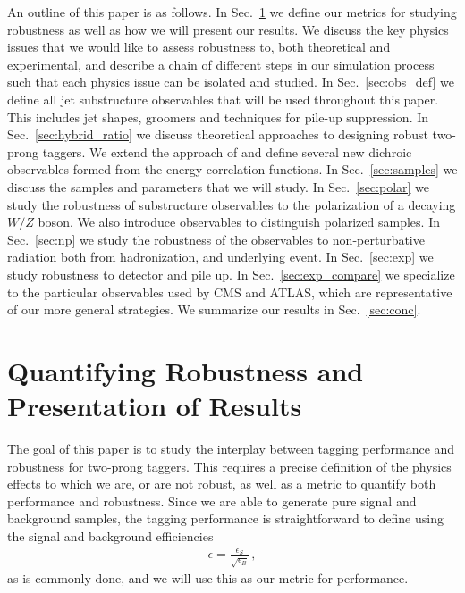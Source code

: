 \documentclass[11pt,letterpaper]{article}
\DeclareRobustCommand{\Sec}[1]{Sec.~\ref{#1}}
\begin{document}
An outline of this paper is as follows. In \Sec{sec:pres} we define our metrics for studying robustness as well as how we will present our results. We discuss the key physics issues that we would like to assess robustness to, both theoretical and experimental, and describe a chain of different steps in our simulation process such that each physics issue can be isolated and studied. In \Sec{sec:obs_def} we define all jet substructure observables that will be used throughout this paper. This includes jet shapes, groomers and techniques for pile-up suppression. In \Sec{sec:hybrid_ratio} we discuss theoretical approaches to designing robust two-prong taggers. We extend the approach of \cite{Salam:2016yht} and define several new dichroic observables formed from the energy correlation functions.  In \Sec{sec:samples} we discuss the samples and parameters that we will study. In \Sec{sec:polar} we study the robustness of substructure observables to the polarization of a decaying $W/Z$ boson. We also introduce observables to distinguish polarized samples. In \Sec{sec:np} we study the robustness of the observables to non-perturbative radiation both from hadronization, and underlying event. In \Sec{sec:exp} we study robustness to detector and pile up. In \Sec{sec:exp_compare} we specialize to the particular observables used by CMS and ATLAS, which are representative of our more general strategies. We summarize our results in \Sec{sec:conc}.

\section{Quantifying Robustness and Presentation of Results}\label{sec:pres}


The goal of this paper is to study the interplay between tagging performance and robustness for two-prong taggers. This requires a precise definition of the physics effects to which we are, or are not robust, as well as a metric to quantify both performance and robustness. Since we are able to generate pure signal and background samples, the tagging performance is straightforward to define using the signal and background efficiencies 
\begin{align}
\epsilon=\frac{\epsilon_S}{\sqrt{\epsilon_B}}\,,
\end{align}
as is commonly done, and we will use this as our metric for performance.
\end{document}

